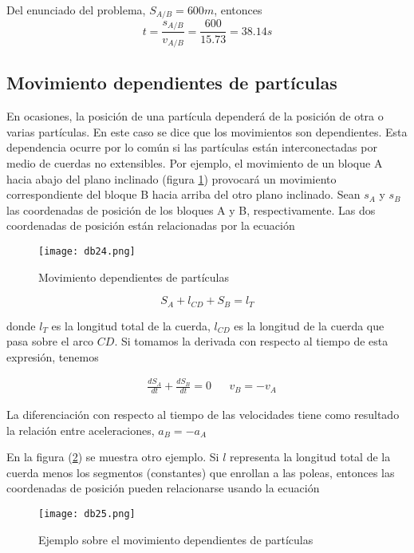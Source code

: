 Del enunciado del problema, $S_{A/B} = 600 m$,
entonces
\begin{equation*}
    t=\frac{s_{A/B}}{v_{A/B}}=\frac{600}{15.73}=38.14s
\end{equation*}

\subsection{Movimiento dependientes de partículas}

En ocasiones, la posición de una partícula dependerá de la
posición de otra o varias partículas. En este caso se dice que los
movimientos son dependientes. Esta dependencia ocurre por
lo común si las partículas están interconectadas por medio de
cuerdas no extensibles. Por ejemplo, el movimiento de un
bloque A hacia abajo del plano inclinado (figura \ref{db24}) provocará un
movimiento correspondiente del bloque B hacia arriba del otro
plano inclinado. Sean $s_A$ y $s_B$ las coordenadas de posición de
los bloques A y B, respectivamente. Las dos coordenadas de
posición están relacionadas por la ecuación

\begin{figure}[h!]
  \centerline{\texttt{[image: db24.png]}}
  \caption{Movimiento dependientes de partículas}
  \label{db24}
\end{figure}

\begin{equation}
    S_A+l_{CD}+S_B=l_T
\end{equation}

donde $l_T$ es la longitud total de la cuerda, $l_{CD}$ es la longitud de
la cuerda que pasa sobre el arco $CD$.
Si tomamos la derivada con respecto al tiempo de esta
expresión, tenemos

\begin{align*}
    &\frac{dS_A}{dt}+\frac{dS_B}{dt}=0&& v_B=-v_A
\end{align*}

La diferenciación con respecto al tiempo de las velocidades tiene
como resultado la relación entre aceleraciones, $a_B=-a_A$

En la figura (\ref{db25}) se muestra otro ejemplo. Si $l$ representa la longitud
total de la cuerda menos los segmentos (constantes) que enrollan a
las poleas, entonces las coordenadas de posición pueden
relacionarse usando la ecuación

\begin{figure}[h!]
  \centerline{\texttt{[image: db25.png]}}
  \caption{Ejemplo sobre el movimiento dependientes de partículas}
  \label{db25}
\end{figure}


